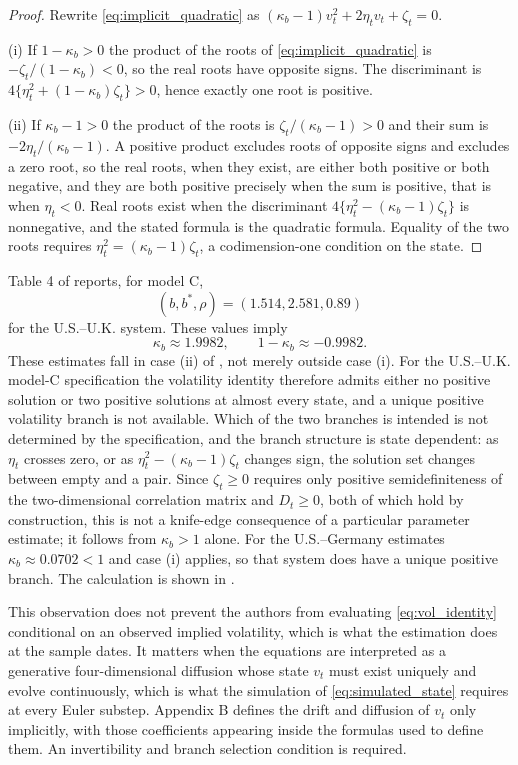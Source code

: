 \documentclass[11pt]{article}
\theoremstyle{definition}
\begin{document}
\begin{proof}
Rewrite \eqref{eq:implicit_quadratic} as $(\kappa_b-1)v_t^2+2\eta_tv_t+\zeta_t=0$.

(i) If $1-\kappa_b>0$ the product of the roots of \eqref{eq:implicit_quadratic} is $-\zeta_t/(1-\kappa_b)<0$, so the real roots have opposite signs. The discriminant is $4\{\eta_t^2+(1-\kappa_b)\zeta_t\}>0$, hence exactly one root is positive.

(ii) If $\kappa_b-1>0$ the product of the roots is $\zeta_t/(\kappa_b-1)>0$ and their sum is $-2\eta_t/(\kappa_b-1)$. A positive product excludes roots of opposite signs and excludes a zero root, so the real roots, when they exist, are either both positive or both negative, and they are both positive precisely when the sum is positive, that is when $\eta_t<0$. Real roots exist when the discriminant $4\{\eta_t^2-(\kappa_b-1)\zeta_t\}$ is nonnegative, and the stated formula is the quadratic formula. Equality of the two roots requires $\eta_t^2=(\kappa_b-1)\zeta_t$, a codimension-one condition on the state.
\end{proof}

Table 4 of \citet{BrandtSantaClara2002} reports, for model C,
\[
(b,b^*,\rho)=(1.514,2.581,0.89)
\]
for the U.S.--U.K. system. These values imply
\[
\kappa_b\approx1.9982,
\qquad
1-\kappa_b\approx-0.9982.
\]
These estimates fall in case (ii) of , not merely outside case (i). For the U.S.--U.K. model-C specification the volatility identity therefore admits either no positive solution or two positive solutions at almost every state, and a unique positive volatility branch is not available. Which of the two branches is intended is not determined by the specification, and the branch structure is state dependent: as $\eta_t$ crosses zero, or as $\eta_t^2-(\kappa_b-1)\zeta_t$ changes sign, the solution set changes between empty and a pair. Since $\zeta_t\ge0$ requires only positive semidefiniteness of the two-dimensional correlation matrix and $D_t\ge0$, both of which hold by construction, this is not a knife-edge consequence of a particular parameter estimate; it follows from $\kappa_b>1$ alone. For the U.S.--Germany estimates $\kappa_b\approx0.0702<1$ and case (i) applies, so that system does have a unique positive branch. The calculation is shown in .

This observation does not prevent the authors from evaluating \eqref{eq:vol_identity} conditional on an observed implied volatility, which is what the estimation does at the sample dates. It matters when the equations are interpreted as a generative four-dimensional diffusion whose state $v_t$ must exist uniquely and evolve continuously, which is what the simulation of \eqref{eq:simulated_state} requires at every Euler substep. Appendix B defines the drift and diffusion of $v_t$ only implicitly, with those coefficients appearing inside the formulas used to define them. An invertibility and branch selection condition is required.
\end{document}
